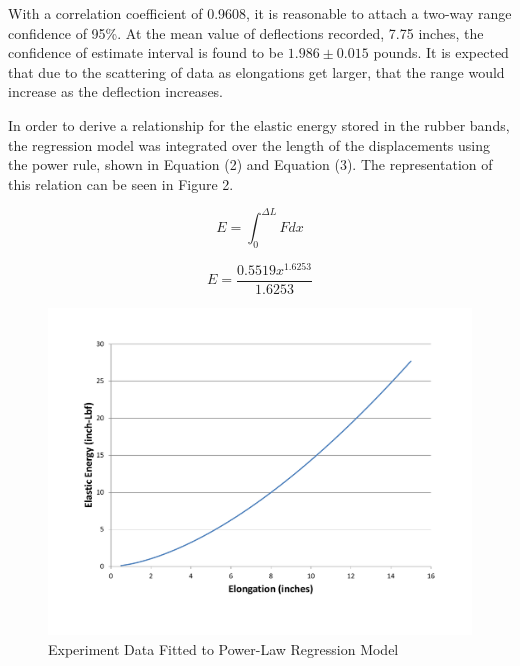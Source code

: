\documentclass[12pt]{article}
\begin{document}
\bigskip
With a correlation coefficient of 0.9608, it is reasonable to attach a two-way range confidence of 95\%. At the mean value of deflections recorded, 7.75 inches, the confidence of estimate interval is found to be $1.986 \pm 0.015$ pounds. It is expected that due to the scattering of data as elongations get larger, that the range would increase as the deflection increases.
\bigskip

In order to derive a relationship for the elastic energy stored in the rubber bands, the regression model was integrated over the length of the displacements using the power rule, shown in Equation (2) and Equation (3). The representation of this relation can be seen in Figure 2.
\bigskip

\begin{equation}
E = \int_{0}^{\Delta L}Fdx
\end{equation}

\bigskip

\begin{equation}
E = \frac{0.5519x^{1.6253}}{1.6253}
\end{equation}

\newpage

\begin{figure}[t!] %
   \centering
   \includegraphics[width=\linewidth]{elastic_energy.pdf} 
   \caption{Experiment Data Fitted to Power-Law Regression Model}
   \label{fig:example}
\end{figure}

\bigskip
\end{document}

